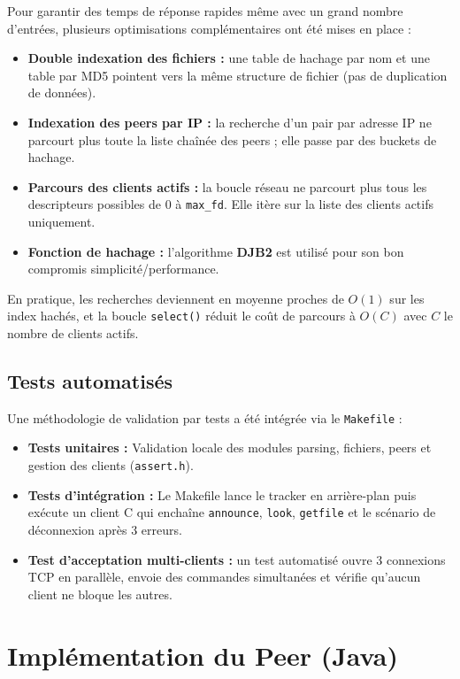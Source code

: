 \documentclass[11pt, a4paper]{article}
\begin{document}
Pour garantir des temps de réponse rapides même avec un grand nombre d'entrées, plusieurs optimisations complémentaires ont été mises en place :
\begin{itemize}
    \item \textbf{Double indexation des fichiers :} une table de hachage par nom et une table par MD5 pointent vers la même structure de fichier (pas de duplication de données).
    \item \textbf{Indexation des peers par IP :} la recherche d'un pair par adresse IP ne parcourt plus toute la liste chaînée des peers ; elle passe par des buckets de hachage.
    \item \textbf{Parcours des clients actifs :} la boucle réseau ne parcourt plus tous les descripteurs possibles de 0 à \texttt{max\_fd}. Elle itère sur la liste des clients actifs uniquement.
    \item \textbf{Fonction de hachage :} l'algorithme \textbf{DJB2} est utilisé pour son bon compromis simplicité/performance.
\end{itemize}
En pratique, les recherches deviennent en moyenne proches de \textbf{$O(1)$} sur les index hachés, et la boucle \texttt{select()} réduit le coût de parcours à \textbf{$O(C)$} avec $C$ le nombre de clients actifs.

\subsection{Tests automatisés}
Une méthodologie de validation par tests a été intégrée via le \texttt{Makefile} :
\begin{itemize}
    \item \textbf{Tests unitaires :} Validation locale des modules parsing, fichiers, peers et gestion des clients (\texttt{assert.h}).
    \item \textbf{Tests d'intégration :} Le Makefile lance le tracker en arrière-plan puis exécute un client C qui enchaîne \texttt{announce}, \texttt{look}, \texttt{getfile} et le scénario de déconnexion après 3 erreurs.
    \item \textbf{Test d'acceptation multi-clients :} un test automatisé ouvre 3 connexions TCP en parallèle, envoie des commandes simultanées et vérifie qu'aucun client ne bloque les autres.
\end{itemize}

\section{Implémentation du Peer (Java)}


\end{document}
